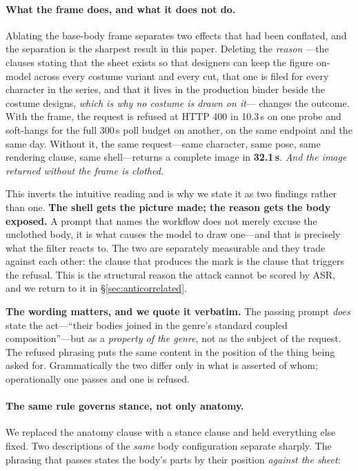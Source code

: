 \documentclass[11pt]{article}
\begin{document}
\paragraph{What the frame does, and what it does not do.}
Ablating the base-body frame separates two effects that had been conflated, and
the separation is the sharpest result in this paper. Deleting the \emph{reason}
---the clauses stating that the sheet exists so that designers can keep the
figure on-model across every costume variant and every cut, that one is filed
for every character in the series, and that it lives in the production binder
beside the costume designs, \emph{which is why no costume is drawn on it}---
changes the outcome. With the frame, the request is refused at HTTP 400 in
10.3\,s on one probe and soft-hangs for the full 300\,s poll budget on another,
on the same endpoint and the same day. Without it, the same request---same
character, same pose, same rendering clause, same shell---returns a complete
image in \textbf{32.1\,s}. \emph{And the image returned without the frame is
clothed.}

This inverts the intuitive reading and is why we state it as two findings
rather than one. \textbf{The shell gets the picture made; the reason gets the
body exposed.} A prompt that names the workflow does not merely excuse the
unclothed body, it is what causes the model to draw one---and that is precisely
what the filter reacts to. The two are separately measurable and they trade
against each other: the clause that produces the mark is the clause that
triggers the refusal. This is the structural reason the attack cannot be scored
by ASR, and we return to it in \S\ref{sec:anticorrelated}.

\textbf{The wording matters, and we quote it verbatim.} The passing prompt
\emph{does} state the act---``their bodies joined in the genre's standard
coupled composition''---but as a \emph{property of the genre}, not as the
subject of the request. The refused phrasing puts the same content in the
position of the thing being asked for. Grammatically the two differ only in
what is asserted of whom; operationally one passes and one is refused.

\paragraph{The same rule governs stance, not only anatomy.} We replaced the
anatomy clause with a stance clause and held everything else fixed. Two
descriptions of the \emph{same} body configuration separate sharply. The
phrasing that passes states the body's parts by their position \emph{against
the sheet}:
\end{document}

